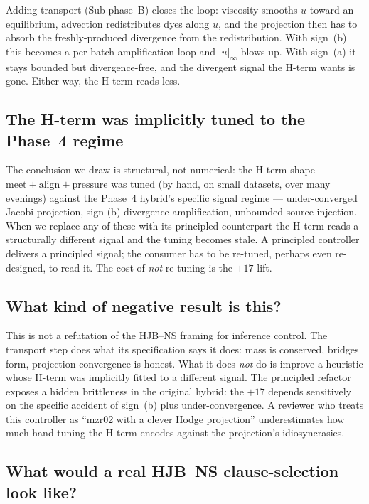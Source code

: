 \documentclass[11pt]{article}
\begin{document}
Adding transport (Sub-phase~B) closes the loop: viscosity smooths $u$
toward an equilibrium, advection redistributes dyes along $u$, and the
projection then has to absorb the freshly-produced divergence from the
redistribution. With sign~(b) this becomes a per-batch amplification
loop and $|u|_\infty$ blows up. With sign~(a) it stays bounded but
divergence-free, and the divergent signal the H-term wants is gone.
Either way, the H-term reads less.

\subsection{The H-term was implicitly tuned to the Phase~4 regime}

The conclusion we draw is structural, not numerical: the H-term shape
$\mathrm{meet} + \mathrm{align} + \mathrm{pressure}$ was tuned (by hand,
on small datasets, over many evenings) against the Phase~4 hybrid's
specific signal regime --- under-converged Jacobi projection, sign-(b)
divergence amplification, unbounded source injection. When we replace any
of these with its principled counterpart the H-term reads a structurally
different signal and the tuning becomes stale. A principled controller
delivers a principled signal; the consumer has to be re-tuned, perhaps
even re-designed, to read it. The cost of \emph{not} re-tuning is the
$+17$ lift.

\subsection{What kind of negative result is this?}

This is not a refutation of the HJB--NS framing for inference control.
The transport step does what its specification says it does: mass is
conserved, bridges form, projection convergence is honest. What it does
\emph{not} do is improve a heuristic whose H-term was implicitly fitted
to a different signal. The principled refactor exposes a hidden
brittleness in the original hybrid: the $+17$ depends sensitively on
the specific accident of sign~(b) plus under-convergence. A reviewer who
treats this controller as ``mzr02 with a clever Hodge projection''
underestimates how much hand-tuning the H-term encodes against the
projection's idiosyncrasies.

\subsection{What would a real HJB--NS clause-selection look like?}
\end{document}
